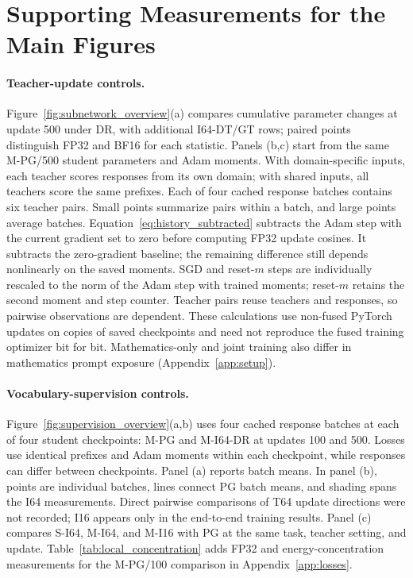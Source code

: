 \section{Supporting Measurements for the Main Figures}
\label{app:nine_panel_support}


\paragraph{Teacher-update controls.}
Figure~\ref{fig:subnetwork_overview}(a) compares cumulative parameter changes at update 500 under DR, with additional I64-DT/GT rows; paired points distinguish FP32 and BF16 for each statistic. Panels (b,c) start from the same M-PG/500 student parameters and Adam moments. With domain-specific inputs, each teacher scores responses from its own domain; with shared inputs, all teachers score the same prefixes. Each of four cached response batches contains six teacher pairs. Small points summarize pairs within a batch, and large points average batches. Equation~\ref{eq:history_subtracted} subtracts the Adam step with the current gradient set to zero before computing FP32 update cosines. It subtracts the zero-gradient baseline; the remaining difference still depends nonlinearly on the saved moments. SGD and reset-$m$ steps are individually rescaled to the norm of the Adam step with trained moments; reset-$m$ retains the second moment and step counter. Teacher pairs reuse teachers and responses, so pairwise observations are dependent. These calculations use non-fused PyTorch updates on copies of saved checkpoints and need not reproduce the fused training optimizer bit for bit. Mathematics-only and joint training also differ in mathematics prompt exposure (Appendix~\ref{app:setup}).

\paragraph{Vocabulary-supervision controls.}
Figure~\ref{fig:supervision_overview}(a,b) uses four cached response batches at each of four student checkpoints: M-PG and M-I64-DR at updates 100 and 500. Losses use identical prefixes and Adam moments within each checkpoint, while responses can differ between checkpoints. Panel (a) reports batch means. In panel (b), points are individual batches, lines connect PG batch means, and shading spans the I64 measurements. Direct pairwise comparisons of T64 update directions were not recorded; I16 appears only in the end-to-end training results. Panel (c) compares S-I64, M-I64, and M-I16 with PG at the same task, teacher setting, and update. Table~\ref{tab:local_concentration} adds FP32 and energy-concentration measurements for the M-PG/100 comparison in Appendix~\ref{app:losses}.

